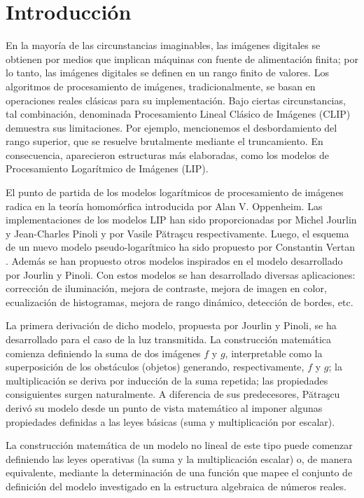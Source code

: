 \chapter*{Introducción}\label{chapter:introduction}

En la mayoría de las circunstancias imaginables, las imágenes digitales se obtienen por medios que implican máquinas con fuente de alimentación finita; por lo tanto, las imágenes digitales se definen en un rango finito de valores. Los algoritmos de procesamiento de imágenes, tradicionalmente, se basan en operaciones reales clásicas para su implementación. Bajo ciertas circunstancias, tal combinación, denominada Procesamiento Lineal Clásico de Imágenes (CLIP) demuestra sus limitaciones. Por ejemplo, mencionemos el desbordamiento del rango superior, que se resuelve brutalmente mediante el truncamiento. En consecuencia, aparecieron estructuras más elaboradas, como los modelos de Procesamiento Logarítmico de Imágenes (LIP).

El punto de partida de los modelos logarítmicos de procesamiento de imágenes radica en la teoría homomórfica introducida por Alan V. Oppenheim. Las implementaciones de los modelos LIP han sido proporcionadas por Michel Jourlin y Jean-Charles Pinoli  y por Vasile Pătraşcu respectivamente. Luego, el esquema de un nuevo modelo pseudo-logarítmico ha sido propuesto por Constantin Vertan \cite{florea2009piecewise}. Adem\'as se han propuesto otros modelos inspirados en el modelo desarrollado por Jourlin y Pinoli. Con estos modelos se han desarrollado diversas aplicaciones: corrección de iluminación, mejora de contraste, mejora de imagen en color, ecualización de histogramas, mejora de rango dinámico, detección de bordes, etc.

La primera derivación de dicho modelo, propuesta por Jourlin y Pinoli, se ha desarrollado para el caso de la luz transmitida. La construcción matemática comienza definiendo la suma de dos imágenes $f$ y $g$, interpretable como la superposición de los obstáculos (objetos) generando, respectivamente, $f$ y $g$; la multiplicación se deriva por inducción de la suma repetida; las propiedades consiguientes surgen naturalmente. A diferencia de sus predecesores, Pătraşcu derivó su modelo desde un punto de vista matemático al imponer algunas propiedades definidas a las leyes básicas (suma y multiplicación por escalar).

La construcción matemática de un modelo no lineal de este tipo puede comenzar definiendo las leyes operativas (la suma y la multiplicación escalar) o, de manera equivalente, mediante la determinación de una función que mapee el conjunto de definición del modelo investigado en la estructura algebraica de números reales.

